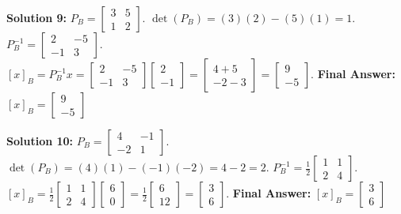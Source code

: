 \documentclass{article}
\begin{document}
\vspace{0.3cm}
\textbf{Solution 9:} $P_B = \begin{bmatrix} 3 & 5 \\ 1 & 2 \end{bmatrix}$. $\det(P_B) = (3)(2) - (5)(1) = 1$.
$P_B^{-1} = \begin{bmatrix} 2 & -5 \\ -1 & 3 \end{bmatrix}$.
$[x]_B = P_B^{-1}x = \begin{bmatrix} 2 & -5 \\ -1 & 3 \end{bmatrix} \begin{bmatrix} 2 \\ -1 \end{bmatrix} = \begin{bmatrix} 4 + 5 \\ -2 - 3 \end{bmatrix} = \begin{bmatrix} 9 \\ -5 \end{bmatrix}$.
\textbf{Final Answer:} $[x]_B = \begin{bmatrix} 9 \\ -5 \end{bmatrix}$

\vspace{0.3cm}
\textbf{Solution 10:} $P_B = \begin{bmatrix} 4 & -1 \\ -2 & 1 \end{bmatrix}$. $\det(P_B) = (4)(1) - (-1)(-2) = 4 - 2 = 2$.
$P_B^{-1} = \frac{1}{2} \begin{bmatrix} 1 & 1 \\ 2 & 4 \end{bmatrix}$.
$[x]_B = \frac{1}{2} \begin{bmatrix} 1 & 1 \\ 2 & 4 \end{bmatrix} \begin{bmatrix} 6 \\ 0 \end{bmatrix} = \frac{1}{2} \begin{bmatrix} 6 \\ 12 \end{bmatrix} = \begin{bmatrix} 3 \\ 6 \end{bmatrix}$.
\textbf{Final Answer:} $[x]_B = \begin{bmatrix} 3 \\ 6 \end{bmatrix}$
\end{document}
